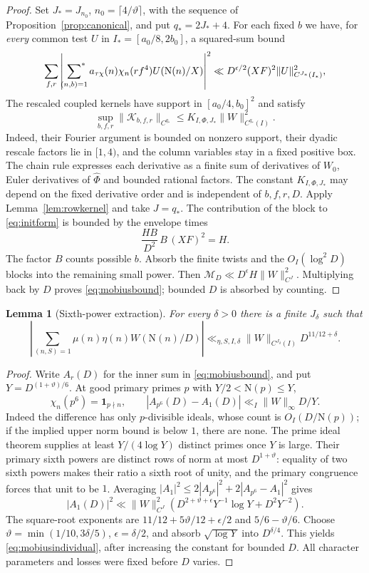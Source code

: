 \documentclass[11pt,a4paper]{article}
\numberwithin{equation}{section}
\newtheorem{lemma}[theorem]{Lemma}
\theoremstyle{definition}
\theoremstyle{remark}
\newcommand{\N}{\mathrm N}
\newcommand{\ind}{\mathbf 1}
\newcommand{\sfstar}{\sideset{}{^*}\sum}
\begin{document}
\begin{proof}
Set $J_*=J_{n_0}$, $n_0=\lceil4/\vartheta\rceil$, with the sequence of Proposition~\ref{prop:canonical}, and put $q_*=2J_*+4$. For each fixed $b$ we have, for \emph{every} common test $U$ in $I_*=[a_0/8,2b_0]$, a squared-sum bound
\[
 \sum_{f,r}\left|\sfstar_{(n,b)=1}a_{\tau\chi}(n)\chi_n(rf^4)U(\N(n)/X)\right|^2
 \ll D^{\epsilon/2}(XF)^2\|U\|_{C^{J_*}(I_*)}^2,
\]
The rescaled coupled kernels have support in $[a_0/4,b_0]^2$ and satisfy
\[
 \sup_{b,f,r}\|\mathcal K_{b,f,r}\|_{C^{q_*}}
 \le K_{I,\Phi,J_*}\|W\|_{C^{q_*}(I)}^2.
\]
Indeed, their Fourier argument is bounded on nonzero support, their dyadic rescale factors lie in $[1,4)$, and the column variables stay in a fixed positive box. The chain rule expresses each derivative as a finite sum of derivatives of $W_0$, Euler derivatives of $\widehat\Phi$ and bounded rational factors. The constant $K_{I,\Phi,J_*}$ may depend on the fixed derivative order and is independent of $b,f,r,D$. Apply Lemma~\ref{lem:rowkernel} and take $J=q_*$. The contribution of the block to \eqref{eq:initform} is bounded by the envelope times
\[
 \frac{HB}{D^2}\,B\,(XF)^2=H.
\]
The factor $B$ counts possible $b$. Absorb the finite twists and the $O_I(\log^2D)$ blocks into the remaining small power. Then $\mathcal M_D\ll D^\epsilon H\|W\|_{C^J}^2$. Multiplying back by $D$ proves \eqref{eq:mobiusbound}; bounded $D$ is absorbed by counting.
\end{proof}

\begin{lemma}[Sixth-power extraction]\label{lem:extraction}
For every $\delta>0$ there is a finite $J_\delta$ such that
\begin{equation}\label{eq:mobiusindividual}
 \left|\sum_{(n,S)=1}\mu(n)\eta(n)W(\N(n)/D)\right|
 \ll_{\eta,S,I,\delta}\|W\|_{C^{J_\delta}(I)}D^{11/12+\delta}.
\end{equation}
\end{lemma}
\begin{proof}
Write $A_r(D)$ for the inner sum in \eqref{eq:mobiusbound}, and put $Y=D^{(1+\vartheta)/6}$. At good primary primes $p$ with $Y/2<\N(p)\le Y$,
\[
 \chi_n(p^6)=\ind_{p\nmid n},\qquad
 |A_{p^6}(D)-A_1(D)|\ll_I\|W\|_\infty D/Y.
\]
Indeed the difference has only $p$-divisible ideals, whose count is $O_I(D/\N(p))$; if the implied upper norm bound is below $1$, there are none. The prime ideal theorem supplies at least $Y/(4\log Y)$ distinct primes once $Y$ is large. Their primary sixth powers are distinct rows of norm at most $D^{1+\vartheta}$: equality of two sixth powers makes their ratio a sixth root of unity, and the primary congruence forces that unit to be $1$. Averaging $|A_1|^2\le2|A_{p^6}|^2+2|A_{p^6}-A_1|^2$ gives
\[
 |A_1(D)|^2\ll\|W\|_{C^J}^2
 \left(D^{2+\vartheta+\epsilon}Y^{-1}\log Y+D^2Y^{-2}\right).
\]
The square-root exponents are $11/12+5\vartheta/12+\epsilon/2$ and $5/6-\vartheta/6$. Choose $\vartheta=\min(1/10,3\delta/5)$, $\epsilon=\delta/2$, and absorb $\sqrt{\log Y}$ into $D^{\delta/4}$. This yields \eqref{eq:mobiusindividual}, after increasing the constant for bounded $D$. All character parameters and losses were fixed before $D$ varies.
\end{proof}
\end{document}
